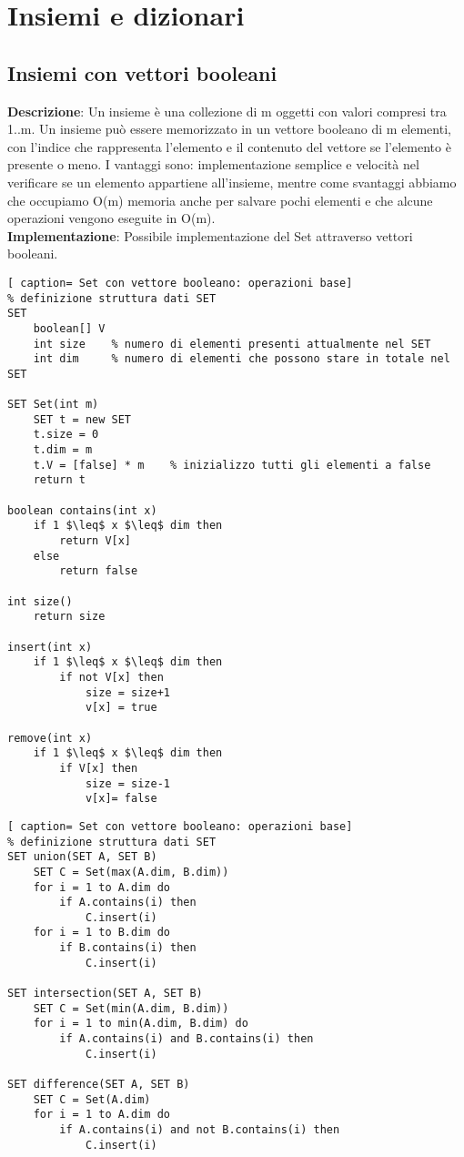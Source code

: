 \documentclass[../cheatSheetAlgoritmi.tex]{subfiles}
\begin{document}
\section{Insiemi e dizionari}
\subsection{Insiemi con vettori booleani}
\textbf{Descrizione}: Un insieme è una collezione di m oggetti con valori compresi tra 1..m. Un insieme può essere memorizzato in un vettore booleano di m elementi, con l'indice che rappresenta l'elemento e il contenuto del vettore se l'elemento è presente o meno. I vantaggi sono: implementazione semplice e velocità nel verificare se un elemento appartiene all'insieme, mentre come svantaggi abbiamo che occupiamo O(m) memoria anche per salvare pochi elementi e che alcune operazioni vengono eseguite in O(m).\\
\textbf{Implementazione}: Possibile implementazione del Set attraverso vettori booleani.\
\begin{lstlisting}[ caption= Set con vettore booleano: operazioni base]
% definizione struttura dati SET
SET 
	boolean[] V
	int size	% numero di elementi presenti attualmente nel SET
	int dim		% numero di elementi che possono stare in totale nel SET
	
SET Set(int m)
	SET t = new SET
	t.size = 0
	t.dim = m
	t.V = [false] * m    % inizializzo tutti gli elementi a false
	return t
	
boolean contains(int x)
	if 1 $\leq$ x $\leq$ dim then
		return V[x]
	else
		return false
		
int size()
	return size

insert(int x)
	if 1 $\leq$ x $\leq$ dim then
		if not V[x] then
			size = size+1
			v[x] = true
			
remove(int x)
	if 1 $\leq$ x $\leq$ dim then 
		if V[x] then
			size = size-1
			v[x]= false
\end{lstlisting}
\newpage
\begin{lstlisting}[ caption= Set con vettore booleano: operazioni base]
% definizione struttura dati SET
SET union(SET A, SET B)
	SET C = Set(max(A.dim, B.dim))
	for i = 1 to A.dim do
		if A.contains(i) then
			C.insert(i)
	for i = 1 to B.dim do
		if B.contains(i) then
			C.insert(i)

SET intersection(SET A, SET B)
	SET C = Set(min(A.dim, B.dim))
	for i = 1 to min(A.dim, B.dim) do
		if A.contains(i) and B.contains(i) then
			C.insert(i)

SET difference(SET A, SET B)
	SET C = Set(A.dim)
	for i = 1 to A.dim do
		if A.contains(i) and not B.contains(i) then
			C.insert(i)	
\end{lstlisting}	
\end{document}
